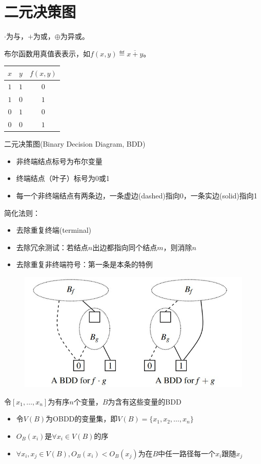 
\section{二元决策图}
$\cdot$为与，$+$为或，$\oplus$为异或。

布尔函数用真值表表示，如$f(x,y)\eqdef\overline{x+y}$。
\begin{center}
\begin{tabular}{cc|c}
$x$ & $y$ & $f(x,y)$\\\hline
$1$ & $1$ & $0$ \\
$1$ & $0$ & $1$ \\
$0$ & $1$ & $0$ \\
$0$ & $0$ & $1$
\end{tabular}
\end{center}

二元决策图(Binary Decision Diagram, BDD)
\begin{itemize}
	\item 非终端结点标号为布尔变量
	\item 终端结点（叶子）标号为0或1
	\item 每一个非终端结点有两条边，一条虚边(dashed)指向0，一条实边(solid)指向1
\end{itemize}

简化法则：
\begin{itemize}
	\item 去除重复终端(terminal)
	\item 去除冗余测试：若结点$n$出边都指向同个结点$m$，则消除$n$
	\item 去除重复非终端符号：第一条是本条的特例
\end{itemize}
\begin{figure}[H]
\centering
\includegraphics[width=0.8\linewidth]{fig/shortcut_bdd.jpg}
\end{figure}

\begin{definition}[有序BDD]
令$[x_1,\ldots,x_n]$为有序$n$个变量，$B$为含有这些变量的BDD
\begin{itemize}
	\item 令$V(B)$为OBDD的变量集，即$V(B)=\{x_1,x_2,\ldots,x_n\}$
	\item $O_B(x_i)$是$\forall x_i\in V(B)$的序
	\item $\forall x_i,x_j\in V(B),O_B(x_i)<O_B(x_j)$为在$B$中任一路径每一个$x_i$跟随$x_j$
\end{itemize}
\end{definition}

